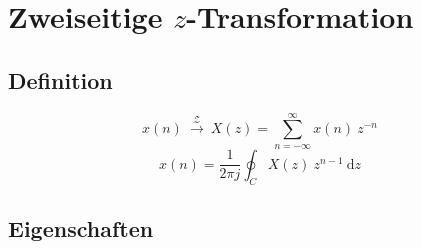 \documentclass[10pt,a4paper]{article}
\newcommand{\ztransform}{
	~\xrightarrow{~\mathcal{Z}~}~
}
\begin{document}
\section*{Zweiseitige $z$-Transformation}
\subsection*{Definition}
\vspace{-1.5em}
\begin{multicols}{2}
	\noindent
	\[ x(n)\ztransform X(z) = \sum_{n=-\infty}^{\infty} x(n) ~ z^{-n} \]
	\[ x(n) = \frac{1}{2\pi j} \oint_C X(z) ~ z^{n-1} ~ \mathrm dz \]
\end{multicols}

\subsection*{Eigenschaften}
\vspace{-1.5em}
\end{document}

